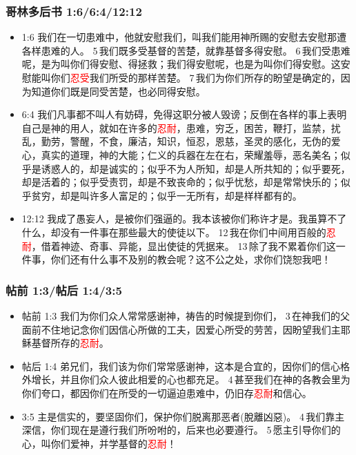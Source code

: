 \subsubsection{哥林多后书 1:6/6:4/12:12} 
\begin{itemize}[noitemsep]
\item 1:6 我们在一切患难中，他就安慰我们，叫我们能用神所赐的安慰去安慰那遭各样患难的人。 5 我们既多受基督的苦楚，就靠基督多得安慰。 6 我们受患难呢，是为叫你们得安慰、得拯救；我们得安慰呢，也是为叫你们得安慰。这安慰能叫你们\textcolor{red}{忍受}我们所受的那样苦楚。 7 我们为你们所存的盼望是确定的，因为知道你们既是同受苦楚，也必同得安慰。
\item 6:4 我们凡事都不叫人有妨碍，免得这职分被人毁谤；反倒在各样的事上表明自己是神的用人，就如在许多的\textcolor{red}{忍耐}，患难，穷乏，困苦，鞭打，监禁，扰乱，勤劳，警醒，不食，廉洁，知识，恒忍，恩慈，圣灵的感化，无伪的爱心，真实的道理，神的大能；仁义的兵器在左在右，荣耀羞辱，恶名美名；似乎是诱惑人的，却是诚实的；似乎不为人所知，却是人所共知的；似乎要死，却是活着的；似乎受责罚，却是不致丧命的；似乎忧愁，却是常常快乐的；似乎贫穷，却是叫许多人富足的；似乎一无所有，却是样样都有的。
\item 12:12 我成了愚妄人，是被你们强逼的。我本该被你们称许才是。我虽算不了什么，却没有一件事在那些最大的使徒以下。 12 我在你们中间用百般的\textcolor{red}{忍耐}，借着神迹、奇事、异能，显出使徒的凭据来。 13 除了我不累着你们这一件事，你们还有什么事不及别的教会呢？这不公之处，求你们饶恕我吧！
\end{itemize}

\subsubsection{帖前 1:3/帖后 1:4/3:5} 
\begin{itemize}[noitemsep]
\item 帖前 1:3 我们为你们众人常常感谢神，祷告的时候提到你们， 3 在神我们的父面前不住地记念你们因信心所做的工夫，因爱心所受的劳苦，因盼望我们主耶稣基督所存的\textcolor{red}{忍耐}。
\item 帖后 1:4 弟兄们，我们该为你们常常感谢神，这本是合宜的，因你们的信心格外增长，并且你们众人彼此相爱的心也都充足。 4 甚至我们在神的各教会里为你们夸口，都因你们在所受的一切逼迫患难中，仍旧存\textcolor{red}{忍耐}和信心。
\item 3:5 主是信实的，要坚固你们，保护你们脱离那恶者(脫離凶惡)。 4 我们靠主深信，你们现在是遵行我们所吩咐的，后来也必要遵行。 5 愿主引导你们的心，叫你们爱神，并学基督的\textcolor{red}{忍耐}！
\end{itemize}

